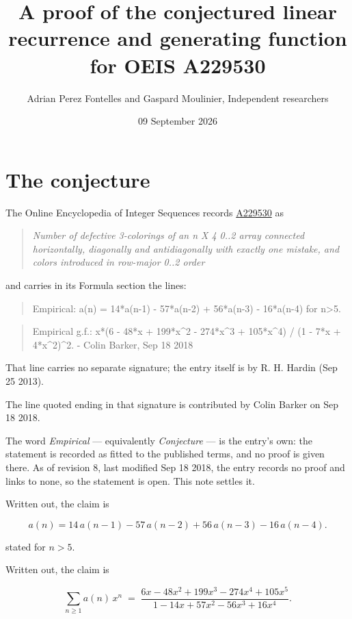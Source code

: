 \documentclass[11pt]{article}
\title{A proof of the conjectured linear recurrence and generating function for OEIS A229530}
\author{Adrian Perez Fontelles and Gaspard Moulinier, Independent researchers}
\date{09 September 2026}
\theoremstyle{definition}
\begin{document}
\maketitle
\section{The conjecture}

The Online Encyclopedia of Integer Sequences records \href{https://oeis.org/A229530}{A229530} as

\begin{quote}\itshape Number of defective 3-colorings of an n X 4 0..2 array connected horizontally, diagonally and antidiagonally with exactly one mistake, and colors introduced in row-major 0..2 order\end{quote}

and carries in its Formula section the lines:

\begin{quote}\ttfamily Empirical: a(n) = 14*a(n-1) - 57*a(n-2) + 56*a(n-3) - 16*a(n-4) for n>5.\end{quote}

\begin{quote}\ttfamily Empirical g.f.: x*(6 - 48*x + 199*x\textasciicircum{}2 - 274*x\textasciicircum{}3 + 105*x\textasciicircum{}4) / (1 - 7*x + 4*x\textasciicircum{}2)\textasciicircum{}2. - Colin Barker, Sep 18 2018\end{quote}

That line carries no separate signature; the entry itself is by R. H. Hardin (Sep 25 2013).

The line quoted ending in that signature is contributed by Colin Barker on Sep 18 2018.

The word {\itshape Empirical} --- equivalently {\itshape Conjecture} --- is the entry's own: the statement is recorded as fitted to the published terms, and no proof is given there. As of revision 8, last modified Sep 18 2018, the entry records no proof and links to none, so the statement is open. This note settles it.

Written out, the claim is

\[a(n) = 14\,a(n-1) - 57\,a(n-2) + 56\,a(n-3) - 16\,a(n-4).\]

stated for $n > 5$.

Written out, the claim is

\[\sum_{n \ge 1} a(n)\,x^n \;=\; \frac{6x - 48x^{2} + 199x^{3} - 274x^{4} + 105x^{5}}{1 - 14x + 57x^{2} - 56x^{3} + 16x^{4}}.\]
\end{document}
